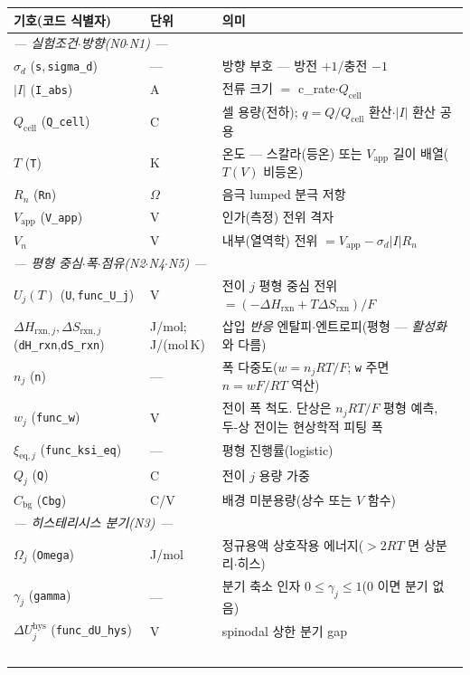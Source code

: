 \documentclass[11pt,a4paper]{article}
\newcommand{\eq}{\mathrm{eq}}
\newcommand{\app}{\mathrm{app}}
\newcommand{\cell}{\mathrm{cell}}
\newcommand{\bg}{\mathrm{bg}}
\newcommand{\rxn}{\mathrm{rxn}}
\newcommand{\hys}{\mathrm{hys}}
\newcommand{\code}[1]{\texttt{#1}}
\begin{document}
\begin{longtable}{p{} p{} p{}}
\toprule 기호(코드 식별자) & 단위 & 의미 \\ \midrule \endhead
\multicolumn{3}{l}{\emph{— 실험조건$\cdot$방향(N0$\cdot$N1) —}}\\
$\sigma_d$ (\code{s},\,\code{sigma\_d}) & --- & 방향 부호 — 방전 $+1$/충전 $-1$ \\
$|I|$ (\code{I\_abs}) & A & 전류 크기 $=$ c\_rate$\cdot Q_\cell$ \\
$Q_\cell$ (\code{Q\_cell}) & C & 셀 용량(전하); $q=Q/Q_\cell$ 환산$\cdot$$|I|$ 환산 공용 \\
$T$ (\code{T}) & K & 온도 — 스칼라(등온) 또는 $V_\app$ 길이 배열($T(V)$ 비등온) \\
$R_n$ (\code{Rn}) & $\Omega$ & 음극 lumped 분극 저항 \\
$V_\app$ (\code{V\_app}) & V & 인가(측정) 전위 격자 \\
$V_n$ & V & 내부(열역학) 전위 $=V_\app-\sigma_d|I|R_n$ \\
\multicolumn{3}{l}{\emph{— 평형 중심$\cdot$폭$\cdot$점유(N2$\cdot$N4$\cdot$N5) —}}\\
$U_j(T)$ (\code{U},\,\code{func\_U\_j}) & V & 전이 $j$ 평형 중심 전위 $=(-\Delta H_\rxn+T\Delta S_\rxn)/F$ \\
$\Delta H_{\rxn,j},\Delta S_{\rxn,j}$ (\code{dH\_rxn},\code{dS\_rxn}) & {\footnotesize J/mol;\,J/(mol\,K)} & 삽입 \emph{반응} 엔탈피$\cdot$엔트로피(평형 — \emph{활성화}와 다름) \\
$n_j$ (\code{n}) & --- & 폭 다중도($w=n_jRT/F$; \code{w} 주면 $n=wF/RT$ 역산) \\
$w_j$ (\code{func\_w}) & V & 전이 폭 척도. 단상은 $n_jRT/F$ 평형 예측, 두-상 전이는 현상학적 피팅 폭 \\
$\xi_{\eq,j}$ (\code{func\_ksi\_eq}) & --- & 평형 진행률(logistic) \\
$Q_j$ (\code{Q}) & C & 전이 $j$ 용량 가중 \\
$C_\bg$ (\code{Cbg}) & C/V & 배경 미분용량(상수 또는 $V$ 함수) \\
\multicolumn{3}{l}{\emph{— 히스테리시스 분기(N3) —}}\\
$\Omega_j$ (\code{Omega}) & J/mol & 정규용액 상호작용 에너지($>2RT$ 면 상분리$\cdot$히스) \\
$\gamma_j$ (\code{gamma}) & --- & 분기 축소 인자 $0\le\gamma_j\le1$($0$ 이면 분기 없음) \\
$\Delta U_j^\hys$ (\code{func\_dU\_hys}) & V & spinodal 상한 분기 gap \\
$$
\end{longtable}
\end{document}
